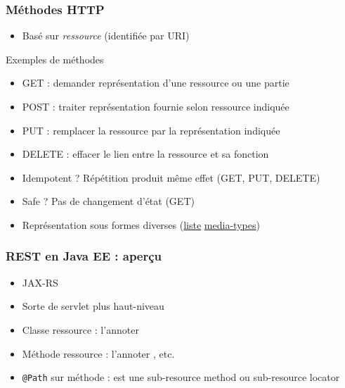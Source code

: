\documentclass[english, french]{beamer}
\begin{document}
\begin{frame}
	\frametitle{Méthodes HTTP}
	\begin{itemize}
		\item Basé sur \emph{ressource} (identifiée par URI)
	\end{itemize}
	\begin{block}{Exemples de méthodes}
		\begin{itemize}
			\item GET : demander représentation d’une ressource {\tiny ou une partie}
			\item POST : traiter représentation fournie selon ressource indiquée
			\item PUT : remplacer la ressource par la représentation indiquée
			\item DELETE : effacer le lien entre la ressource et sa fonction
		\end{itemize}
	\end{block}
	\begin{itemize}
		\item Idempotent ? \pause Répétition produit même effet (GET, PUT, DELETE)
		\item Safe ? \pause Pas de changement d’état (GET)
		\item Représentation sous formes diverses (\href{http://www.iana.org/assignments/media-types/}{liste} \href{http://tools.ietf.org/html/rfc7231\#section-3.1.1.1}{media-types})
	\end{itemize}
\end{frame}

\begin{frame}
	\frametitle{REST en Java EE : aperçu}
	\begin{itemize}
		\item JAX-RS
		\item Sorte de servlet plus haut-niveau
		\item Classe ressource : l’annoter 
		\item Méthode ressource :  l’annoter , etc.
		\item \texttt{@Path} sur méthode : est une sub-resource method {\tiny ou sub-resource locator}
	\end{itemize}
\end{frame}
\end{document}
